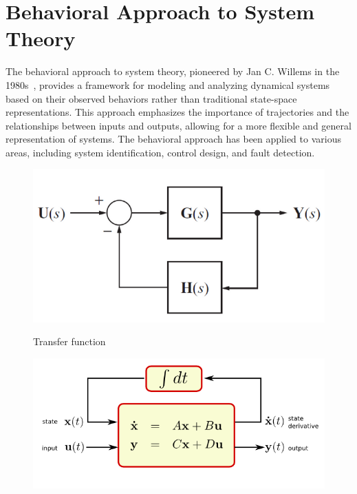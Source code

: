 \section{Behavioral Approach to System Theory}
The behavioral approach to system theory, pioneered by Jan C. Willems in the 1980s~\cite{willems1986}, provides a framework for modeling and analyzing dynamical systems based on their observed behaviors rather than traditional state-space representations. This approach emphasizes the importance of trajectories and the relationships between inputs and outputs, allowing for a more flexible and general representation of systems. The behavioral approach has been applied to various areas, including system identification, control design, and fault detection.

    \begin{figure}[h]
        \centering
        \begin{minipage}{0.32\textwidth}
            \centering
            \includegraphics[width=\linewidth]{figures/transfer-function.png}
            \parbox{\linewidth}{\centering\small Transfer function}
        \end{minipage}\hfill
        \begin{minipage}{0.32\textwidth}
            \centering
            \includegraphics[width=\linewidth, trim={2cm, 0cm, 3cm, 0cm}, clip]{figures/state-space.png}

\end{minipage}
\end{figure}
